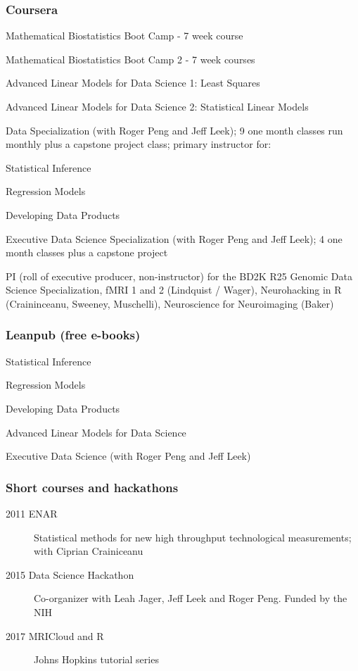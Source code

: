 \documentclass[12pt]{article}
\begin{document}
\subsubsection*{Coursera}
\begin{description}
\item Mathematical Biostatistics Boot Camp - 7 week course 
\item Mathematical Biostatistics Boot Camp 2 - 7 week courses 
\item Advanced Linear Models for Data Science 1: Least Squares
\item Advanced Linear Models for Data Science 2: Statistical Linear Models
\item Data Specialization (with Roger Peng and Jeff Leek); 9 one month classes run monthly plus a  capstone project class; primary instructor for:
\begin{description}
\item Statistical Inference
\item Regression Models
\item Developing Data Products
\end{description}
\item Executive Data Science Specialization (with Roger Peng and Jeff Leek); 4 one month classes plus a capstone project
\item PI (roll of executive producer, non-instructor) for the BD2K R25 Genomic Data Science Specialization, fMRI 1 and 2 (Lindquist / Wager), Neurohacking in R (Craininceanu, Sweeney, Muschelli), Neuroscience for Neuroimaging (Baker)
\end{description}

\subsubsection*{Leanpub (free e-books)}
\begin{description}
    \item Statistical Inference
    \item Regression Models
    \item Developing Data Products
    \item Advanced Linear Models for Data Science
    \item Executive Data Science (with Roger Peng and Jeff Leek)
\end{description}

\subsubsection*{Short courses and hackathons}
\begin{description}
\item[\textnormal{2011 ENAR}] Statistical methods for new high throughput technological measurements; with Ciprian Crainiceanu
\item[\textnormal{2015 Data Science Hackathon}] Co-organizer with
Leah Jager, Jeff Leek and Roger Peng. Funded by the NIH
\item[\textnormal{2017 MRICloud and R}] Johns Hopkins tutorial series
\end{description}
\end{document}
